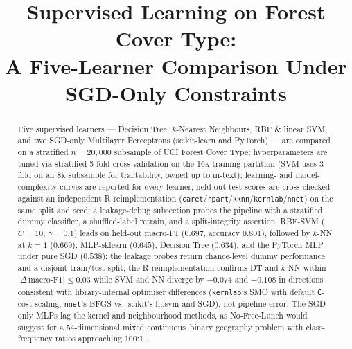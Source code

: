 \documentclass[conference]{IEEEtran}
\title{\color{denimdark}\textbf{Supervised Learning on Forest Cover Type:\\
       A Five-Learner Comparison Under SGD-Only Constraints}}
\author{
  \IEEEauthorblockN{Timothy Leung}
  \IEEEauthorblockA{Georgia Institute of Technology, OMSCS\\
                    CS 7641 --- Machine Learning, Summer 2026\\
                    gtID 904150400 \quad \texttt{tleung37@gatech.edu}}
}
\begin{document}
\renewcommand{\arraystretch}{0.88}
\setlength{\abovecaptionskip}{2pt}
\setlength{\belowcaptionskip}{0pt}
\setlength{\floatsep}{4pt}
\setlength{\textfloatsep}{4pt}
\setlength{\intextsep}{4pt}
\setlength{\columnsep}{12pt}

\maketitle
\thispagestyle{plain}

\begin{abstract}
Five supervised learners --- Decision Tree, $k$-Nearest Neighbours, RBF \& linear
SVM, and two SGD-only Multilayer Perceptrons (scikit-learn and PyTorch) --- are
compared on a stratified $n{=}20{,}000$ subsample of UCI Forest Cover Type;
hyperparameters are tuned via stratified 5-fold cross-validation on the 16k
training partition (SVM uses 3-fold on an 8k subsample for tractability, owned
up to in-text); learning- and model-complexity curves are reported for every
learner; held-out test scores are cross-checked against an independent R
reimplementation (\texttt{caret}/\texttt{rpart}/\texttt{kknn}/\texttt{kernlab}/\texttt{nnet})
on the same split and seed; a leakage-debug subsection probes the pipeline with
a stratified dummy classifier, a shuffled-label retrain, and a split-integrity
assertion. RBF-SVM ($C{=}10$, $\gamma{=}0.1$) leads on held-out macro-F1
($0.697$, accuracy $0.801$), followed by $k$-NN at $k{=}1$ ($0.669$), MLP-sklearn
($0.645$), Decision Tree ($0.634$), and the PyTorch MLP under pure SGD
($0.538$); the leakage probes return chance-level dummy performance and a
disjoint train/test split; the R reimplementation confirms DT and $k$-NN within
$|\Delta\,\text{macro-F1}|{\le}0.03$ while SVM and NN diverge by $-0.074$ and
$-0.108$ in directions consistent with library-internal optimiser differences
(\texttt{kernlab}'s SMO with default \texttt{C}-cost scaling, \texttt{nnet}'s
BFGS vs.\ scikit's libsvm and SGD), not pipeline error. The SGD-only MLPs lag
the kernel and neighbourhood methods, as No-Free-Lunch would suggest for a
54-dimensional mixed continuous--binary geography problem with class-frequency
ratios approaching 100:1 \cite{wolpert1996nfl,blackard1999}.
\end{abstract}
\end{document}
